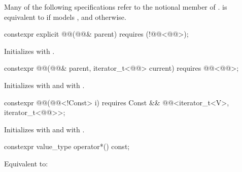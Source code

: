\pnum
Many of the following specifications refer to the notional member
 of .
 is equivalent to  if 
models , and  otherwise.

%
\begin{itemdecl}
constexpr explicit @@(@@& parent)
  requires (!@@<@@>);
\end{itemdecl}

\begin{itemdescr}
\pnum
\effects
Initializes  with .
\end{itemdescr}

%
\begin{itemdecl}
constexpr @@(@@& parent, iterator_t<@@> current)
  requires @@<@@>;
\end{itemdecl}

\begin{itemdescr}
\pnum
\effects
Initializes  with 
and  with .
\end{itemdescr}

%
\begin{itemdecl}
constexpr @@(@@<!Const> i)
  requires Const && @@<iterator_t<V>, iterator_t<@@>>;
\end{itemdecl}

\begin{itemdescr}
\pnum
\effects
Initializes  with  and
 with .
\end{itemdescr}

%
\begin{itemdecl}
constexpr value_type operator*() const;
\end{itemdecl}

\begin{itemdescr}
\pnum
\effects
Equivalent to: 
\end{itemdescr}

